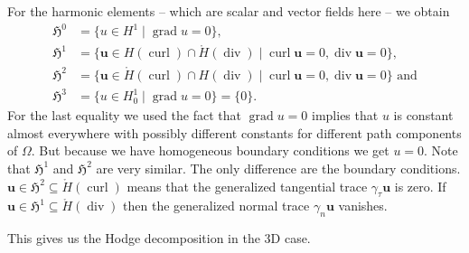 \documentclass[12pt,a4paper]{article}
\numberwithin{equation}{subsection}
\numberwithin{lemma}{subsection}
\theoremstyle{definition}
\DeclareMathOperator{\curl}{curl}
\DeclareMathOperator{\diver}{div}
\DeclareMathOperator{\grad}{grad}
\begin{document}
For the harmonic elements -- which are scalar and vector fields here -- 
we obtain
\begin{align*}
    \mathfrak{H}^0 &= \{ u \in H^1 \mid \grad u = 0\},
    \\ \mathfrak{H}^1 &= \{ \mathbf{u} \in H(\curl) \cap \mathring{H}(\diver)
        \mid \curl \mathbf{u} = 0, \diver \mathbf{u} = 0\},
    \\ \mathfrak{H}^2 &= \{ \mathbf{u} \in \mathring{H}(\curl) \cap H(\diver)
        \mid \curl \mathbf{u} = 0, \diver \mathbf{u} = 0\} \text{ and}
    \\ \mathfrak{H}^3 &= \{ u \in H^1_0
       \mid \grad u = 0\} = \{0\}.
\end{align*}
For the last equality we used the fact that $\grad u = 0$ implies that 
$u$ is constant almost everywhere with possibly different constants for 
different path components of $\Omega$. But because we have homogeneous boundary 
conditions we get $u=0$. Note that $\mathfrak{H}^1$ and $\mathfrak{H}^2$ 
are very similar. The only difference are the boundary conditions. 
$\mathbf{u} \in \mathfrak{H}^2 \subseteq \mathring{H}(\curl)$ 
means that the generalized tangential 
trace $\gamma_\tau \mathbf{u}$ is zero. If $\mathbf{u}  \in \mathfrak{H}^1 
\subseteq \mathring{H}(\diver)$ 
then the 
generalized normal trace $\gamma_n \mathbf{u}$ vanishes.

This gives us the Hodge decomposition in the 3D case.
\end{document}
